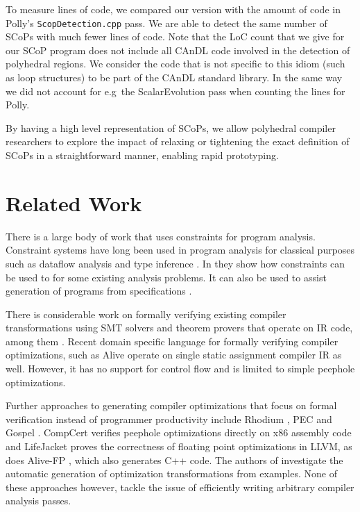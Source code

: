     To measure lines of code, we compared our version with the amount of code in
    Polly's \texttt{ScopDetection.cpp} pass.
    We are able to detect the same number of SCoPs with much fewer lines of
    code.
    Note that the LoC count that we give for our SCoP program does not include
    all CAnDL code involved in the detection of polyhedral regions.
    We consider the code that is not specific to this idiom (such as loop
    structures) to be part of the CAnDL standard library.
    In the same way we did not account for e.g\ the ScalarEvolution pass when
    counting the lines for Polly.

    By having a high level representation of SCoPs, we allow polyhedral compiler
    researchers to explore the impact of relaxing or tightening the exact
    definition of SCoPs in a straightforward manner, enabling rapid prototyping.


\begin{figure}[ht]
    
    \label{fig:candlvspolly}
\end{figure}

\section{Related Work}

    There is a large body of work that uses constraints for program analysis.
    Constraint systems have long been used in program analysis for classical
    purposes such as dataflow analysis and type inference
    \cite{Aiken:1999:ISC:339853.339897}.
    In \cite{Gulwani:2008:PAC:1375581.1375616} they show how constraints can be
    used to for some  existing analysis problems.
    It can also be used to assist generation of programs from specifications
    \cite{Srivastava:2010:PVP:1707801.1706337}.

    There is considerable work on formally verifying existing compiler
    transformations using SMT solvers and theorem provers that operate on IR
    code, among them \cite{Zhao:2012:FLI:2103656.2103709}.
    Recent domain specific language for formally verifying compiler
    optimizations, such as Alive \cite{Lopes:2015:PCP:2737924.2737965} operate
    on single static assignment compiler IR as well.
    However, it has no support for control flow and is limited to simple
    peephole optimizations.

    Further approaches to generating compiler optimizations that focus on formal
    verification instead of programmer productivity include Rhodium
    \cite{Lerner:2005:ASP:1040305.1040335}, PEC
    \cite{Kundu:2009:POC:1543135.1542513} and Gospel
    \cite{Whitfield:1997:AEC:267959.267960}.
    CompCert \cite{Mullen:2016:VPO:2908080.2908109} verifies peephole
    optimizations directly on x86 assembly code and LifeJacket
    \cite{Notzli:2016:LVP:2931021.2931024} proves the correctness of floating
    point optimizations in LLVM, as does Alive-FP \cite{Menendez2016}, which
    also generates C++ code.
    The authors of \cite{Tate:2010:GCO:1706299.1706345} investigate the
    automatic generation of optimization transformations from examples.
    None of these approaches however, tackle the issue of efficiently writing
    arbitrary compiler analysis passes.

